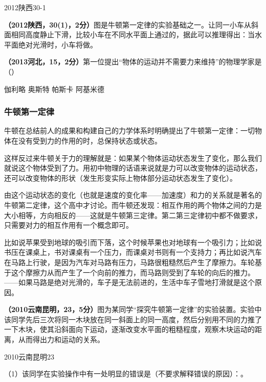 \documentclass[12pt,twoside]{exam}
\begin{document}
\begin{knowledge}
\begin{fig}{2012陕西30-1}
\end{fig}

\textbf{（2012陕西，30(1)，2分）}图是牛顿第一定律的实验基础之一。让同一小车从斜面相同高度静止下滑，比较小车在不同水平面上通过的，据此可以推理得出：当水平面绝对光滑时，小车将做。

\textbf{（2013河北，15，2分）}第一位提出“物体的运动并不需要力来维持”的物理学家是（\answerline*[A]）

\begin{oneparchoices}
\choice 伽利略
\choice 奥斯特
\choice 帕斯卡
\choice 阿基米德
\end{oneparchoices}

\subsubsection{牛顿第一定律}
牛顿在总结前人的成果和构建自己的力学体系时明确提出了牛顿第一定律：一切物体在没有受到力的作用的时，总保持\answerline*[静止]状态或状态。

这样反过来牛顿关于力的理解就是：如果某个物体运动状态发生了变化，那么我们就说这个物体受到了力。用初中物理的话语来说就是力可以改变物体的运动状态，还可以改变物体的形状（发生形变实际上物体部分运动状态发生了变化）。

由这个运动状态的变化（也就是速度的变化率——加速度）和力的关系就是著名的牛顿第二定律，这个高中才讨论。而牛顿还发现：相互作用的两个物体之间的力是大小相等，方向相反的——这就是牛顿第三定律。第二第三定律初中都不做要求，只需要对力的相互作用有一个概念即可。

比如说苹果受到地球的吸引而下落，这个时候苹果也对地球有一个吸引力；比如说书压在课桌上，书对课桌有一个压力，而课桌对书则有一个支持力；再比如说汽车在马路上行驶，是因为汽车对马路有压力，马路很粗糙然后产生了摩擦力。车轮基于这个摩擦力从而产生了一个向前的推力，而马路则受到了车轮的向后的推力。——如果马路是绝对光滑的，车子是无法前进的，生活中车子雪地打滑就是这个原因。

\textbf{（2010云南昆明，23，5分）}图为某同学“探究牛顿第一定律”的实验装置。实验中该同学先后三次将同一木块放在同一斜面上的同一高度，然后分别用不同的力推了一下木块，使其沿斜面向下运动，逐渐改变水平面的粗糙程度，观察木块运动的距离，从而得出力和运动的关系。
\begin{linefig}{2010云南昆明23}
\end{linefig}

（1）该同学在实验操作中有一处明显的错误是（不要求解释错误的原因）：。


\end{knowledge}
\end{document}
